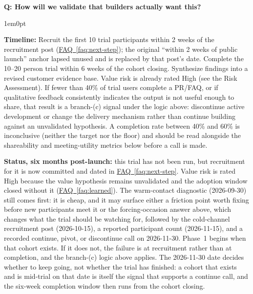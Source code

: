 \documentclass[11pt,letterpaper]{article}
\newcounter{faqnum}
\newenvironment{faqpair}[1]{%
  \needspace{4\baselineskip}%
  \vspace{0.5em}%
  \refstepcounter{faqnum}%
  \noindent\textbf{\color{SectionBlue}Q\thefaqnum: #1}\par\nopagebreak[4]%
  \vspace{0.2em}%
  \begin{adjustwidth}{1em}{0pt}%
  \setlength{\parindent}{0pt}%
}{%
  \end{adjustwidth}%
  \vspace{0.5em}%
}
\newcommand{\faqref}[1]{\hyperref[#1]{FAQ~\ref*{#1}}}
\begin{document}
\begin{faqpair}{How will we validate that builders actually want this?}
  \textbf{Timeline:} Recruit the first 10 trial participants within 2 weeks of the recruitment post (\faqref{faq:next-step}); the original ``within 2 weeks of public launch'' anchor lapsed unused and is replaced by that post's date. Complete the 10--20 person trial within 6 weeks of the cohort closing. Synthesize findings into a revised customer evidence base. Value risk is already rated High (see the Risk Assessment). If fewer than 40\% of trial users complete a PR/FAQ, or if qualitative feedback consistently indicates the output is not useful enough to share, that result is a branch-(c) signal under the logic above: discontinue active development or change the delivery mechanism rather than continue building against an unvalidated hypothesis. A completion rate between 40\% and 60\% is inconclusive (neither the target nor the floor) and should be read alongside the shareability and meeting-utility metrics below before a call is made.

  \textbf{Status, six months post-launch:} this trial has not been run, but recruitment for it is now committed and dated in \faqref{faq:next-step}. Value risk is rated High because the value hypothesis remains unvalidated and the adoption window closed without it (\faqref{faq:learned}). The warm-contact diagnostic (2026-09-30) still comes first: it is cheap, and it may surface either a friction point worth fixing before new participants meet it or the forcing-occasion answer above, which changes what the trial should be watching for, followed by the cold-channel recruitment post (2026-10-15), a reported participant count (2026-11-15), and a recorded continue, pivot, or discontinue call on 2026-11-30. Phase~1 begins when that cohort exists. If it does not, the failure is at recruitment rather than at completion, and the branch-(c) logic above applies. The 2026-11-30 date decides whether to keep going, not whether the trial has finished: a cohort that exists and is mid-trial on that date is itself the signal that supports a continue call, and the six-week completion window then runs from the cohort closing.
\end{faqpair}
\end{document}
